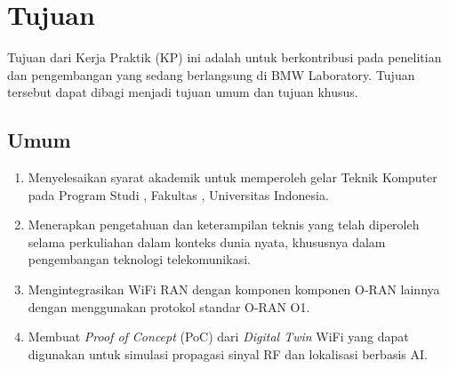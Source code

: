 \section{Tujuan}
Tujuan dari Kerja Praktik (KP) ini adalah untuk berkontribusi pada penelitian dan pengembangan yang sedang berlangsung di BMW Laboratory. Tujuan tersebut dapat dibagi menjadi tujuan umum dan tujuan khusus.

\subsection{Umum}

\begin{enumerate}
    \item Menyelesaikan syarat akademik untuk memperoleh gelar Teknik Komputer pada Program Studi \program, Fakultas \fakultas, Universitas Indonesia.
    \item Menerapkan pengetahuan dan keterampilan teknis yang telah diperoleh selama perkuliahan dalam konteks dunia nyata, khususnya dalam pengembangan teknologi telekomunikasi.
    \item Mengintegrasikan WiFi RAN dengan komponen komponen O-RAN lainnya dengan menggunakan protokol standar O-RAN O1.
    \item Membuat \textit{Proof of Concept} (PoC) dari \textit{Digital Twin} WiFi yang dapat digunakan untuk simulasi propagasi sinyal RF dan lokalisasi berbasis AI.
\end{enumerate}

